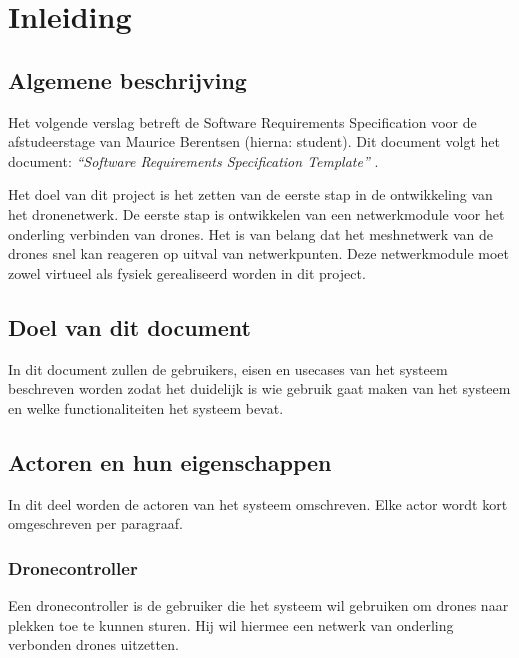 \documentclass[a4paper, 11pt, oneside]{report}
\begin{document}



\chapter{Inleiding}
\label{inleiding}
\section{Algemene beschrijving}
\label{inleiding:beschrijving}
Het volgende verslag betreft de Software Requirements Specification voor de afstudeerstage van Maurice Berentsen (hierna: student).
Dit document volgt het document: \textit{``Software Requirements Specification Template''} \cite{template:srs}.

Het doel van dit project is het zetten van de eerste stap in de ontwikkeling van het dronenetwerk.
De eerste stap is ontwikkelen van een netwerkmodule voor het onderling verbinden van drones.
Het is van belang dat het meshnetwerk van de drones snel kan reageren op uitval van netwerkpunten.
Deze netwerkmodule moet zowel virtueel als fysiek gerealiseerd worden in dit project.
 

\section{Doel van dit document}
\label{inleiding:doelvanditdoucment}

In dit document zullen de gebruikers, eisen en usecases van het systeem beschreven worden zodat het duidelijk is wie gebruik gaat maken van het systeem en welke functionaliteiten het systeem bevat.   

\section{Actoren en hun eigenschappen}
\label{inleiding:gebruikers}
In dit deel worden de actoren van het systeem omschreven. 
Elke actor wordt kort omgeschreven per paragraaf.

\subsection{Dronecontroller}
\label{inleiding:gebruikers:dronecontroller}
Een dronecontroller is de gebruiker die het systeem wil gebruiken om drones naar plekken toe te kunnen sturen.
Hij wil hiermee een netwerk van onderling verbonden drones uitzetten.  
\end{document}
